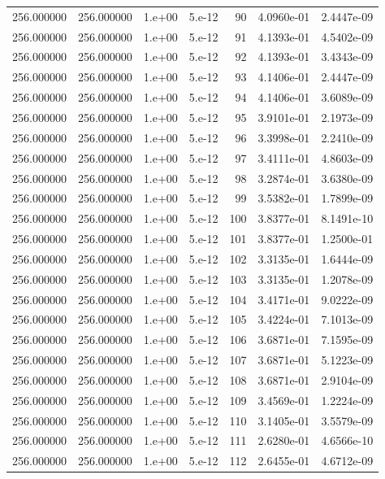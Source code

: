 \begin{table}[htbp]
\begin{tabular}{rrrrrrr}
256.000000 & 256.000000 & 1.e+00 & 5.e-12 & 90 & 4.0960e-01 & 2.4447e-09 \\
256.000000 & 256.000000 & 1.e+00 & 5.e-12 & 91 & 4.1393e-01 & 4.5402e-09 \\
256.000000 & 256.000000 & 1.e+00 & 5.e-12 & 92 & 4.1393e-01 & 3.4343e-09 \\
256.000000 & 256.000000 & 1.e+00 & 5.e-12 & 93 & 4.1406e-01 & 2.4447e-09 \\
256.000000 & 256.000000 & 1.e+00 & 5.e-12 & 94 & 4.1406e-01 & 3.6089e-09 \\
256.000000 & 256.000000 & 1.e+00 & 5.e-12 & 95 & 3.9101e-01 & 2.1973e-09 \\
256.000000 & 256.000000 & 1.e+00 & 5.e-12 & 96 & 3.3998e-01 & 2.2410e-09 \\
256.000000 & 256.000000 & 1.e+00 & 5.e-12 & 97 & 3.4111e-01 & 4.8603e-09 \\
256.000000 & 256.000000 & 1.e+00 & 5.e-12 & 98 & 3.2874e-01 & 3.6380e-09 \\
256.000000 & 256.000000 & 1.e+00 & 5.e-12 & 99 & 3.5382e-01 & 1.7899e-09 \\
256.000000 & 256.000000 & 1.e+00 & 5.e-12 & 100 & 3.8377e-01 & 8.1491e-10 \\
256.000000 & 256.000000 & 1.e+00 & 5.e-12 & 101 & 3.8377e-01 & 1.2500e-01 \\
256.000000 & 256.000000 & 1.e+00 & 5.e-12 & 102 & 3.3135e-01 & 1.6444e-09 \\
256.000000 & 256.000000 & 1.e+00 & 5.e-12 & 103 & 3.3135e-01 & 1.2078e-09 \\
256.000000 & 256.000000 & 1.e+00 & 5.e-12 & 104 & 3.4171e-01 & 9.0222e-09 \\
256.000000 & 256.000000 & 1.e+00 & 5.e-12 & 105 & 3.4224e-01 & 7.1013e-09 \\
256.000000 & 256.000000 & 1.e+00 & 5.e-12 & 106 & 3.6871e-01 & 7.1595e-09 \\
256.000000 & 256.000000 & 1.e+00 & 5.e-12 & 107 & 3.6871e-01 & 5.1223e-09 \\
256.000000 & 256.000000 & 1.e+00 & 5.e-12 & 108 & 3.6871e-01 & 2.9104e-09 \\
256.000000 & 256.000000 & 1.e+00 & 5.e-12 & 109 & 3.4569e-01 & 1.2224e-09 \\
256.000000 & 256.000000 & 1.e+00 & 5.e-12 & 110 & 3.1405e-01 & 3.5579e-09 \\
256.000000 & 256.000000 & 1.e+00 & 5.e-12 & 111 & 2.6280e-01 & 4.6566e-10 \\
256.000000 & 256.000000 & 1.e+00 & 5.e-12 & 112 & 2.6455e-01 & 4.6712e-09 \\

\end{tabular}
\end{table}
